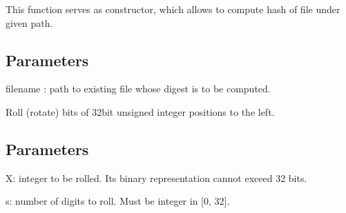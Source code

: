 \documentclass[letterpaper,10pt,english]{sphinxmanual}
\begin{document}
\begin{fulllineitems}
\begin{fulllineitems}
\label{\detokenize{todo_project_name:todo_project_name.mdn.MDN.from_file}}
\pysigstartsignatures
{}
\pysigstopsignatures
\sphinxAtStartPar
This function serves as constructor, which allows to compute hash
of file under given path.


\subsection{Parameters}
\label{\detokenize{todo_project_name:id4}}
\sphinxAtStartPar
filename
: path to existing file whose digest is to be computed.

\end{fulllineitems}


\begin{fulllineitems}
\label{\detokenize{todo_project_name:todo_project_name.mdn.MDN.l_roll}}
\pysigstartsignatures
{}
\pysigstopsignatures
\sphinxAtStartPar
Roll (rotate) bits of 32\sphinxhyphen{}bit unsigned integer  positions
to the left.


\subsection{Parameters}
\label{\detokenize{todo_project_name:id5}}
\sphinxAtStartPar
X: integer to be rolled. Its binary representation cannot exceed 32 bits.

\sphinxAtStartPar
s: number of digits to roll. Must be integer in {[}0, 32{]}.

\end{fulllineitems}



\end{fulllineitems}
\end{document}

